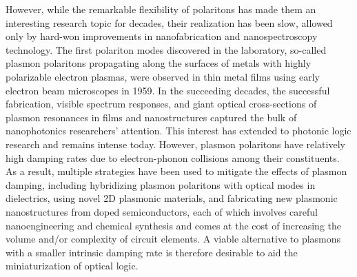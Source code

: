 \documentclass[11pt,a4paper]{article}
\begin{document}
However, while the remarkable flexibility of polaritons has made them an interesting research topic for decades, their realization has been slow, allowed only by hard-won improvements in nanofabrication and nanospectroscopy technology. The first polariton modes discovered in the laboratory, so-called plasmon polaritons propagating along the surfaces of metals with highly polarizable electron plasmas, were observed in thin metal films using early electron beam microscopes in 1959.\supercite{powell_origin_1959} In the succeeding decades, the successful fabrication, visible spectrum responses, and giant optical cross-sections of plasmon resonances in films and nanostructures captured the bulk of nanophotonics researchers' attention. This interest has extended to photonic logic research and remains intense today.\supercite{fang_nanoplasmonic_2015,davis_plasmonic_2016,tuniz_nanoscale_2021} However, plasmon polaritons have relatively high damping rates due to electron-phonon collisions among their constituents. As a result, multiple strategies have been used to mitigate the effects of plasmon damping, including hybridizing plasmon polaritons with optical modes in dielectrics, using novel 2D plasmonic materials, and fabricating new plasmonic nanostructures from doped semiconductors, each of which involves careful nanoengineering and chemical synthesis and comes at the cost of increasing the volume and/or complexity of circuit elements.\supercite{davis_plasmonic_2016} A viable alternative to plasmons with a smaller intrinsic damping rate is therefore desirable to aid the miniaturization of optical logic.
\end{document}
